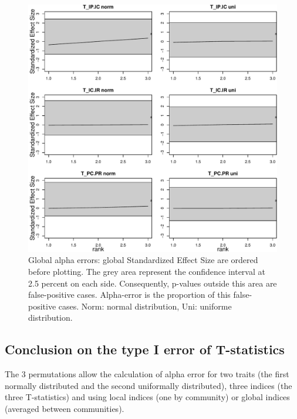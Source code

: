 \documentclass[12pt]{article}\usepackage[]{graphicx}\usepackage[]{color}
\makeatletter
\def\maxwidth{ %
  \ifdim\Gin@nat@width>\linewidth
    \linewidth
  \else
    \Gin@nat@width
  \fi
}
\newenvironment{knitrout}{}{} %
\makeatother
\begin{document}
\begin{knitrout}
\begin{figure}
{\centering \includegraphics[width=\maxwidth]{figure/No_filter_summary_plot-1} 

}

\caption[Global alpha errors]{Global alpha errors: global Standardized Effect Size are ordered before plotting. The grey area represent the confidence interval at 2.5 percent on each side. Consequently, p-values outside this area are false-positive cases. Alpha-error is the proportion of this false-positive cases. Norm: normal distribution, Uni: uniforme distribution.}\label{fig:No_filter_summary_plot}
\end{figure}


\end{knitrout}

  \subsection {Conclusion on the type I error of T-statistics}

The 3 permutations allow the calculation of alpha error for two traits (the first normally distributed and the second uniformally distributed), three indices (the three T-statistics) and using local indices (one by community) or global indices (averaged between communities).
\end{document}

